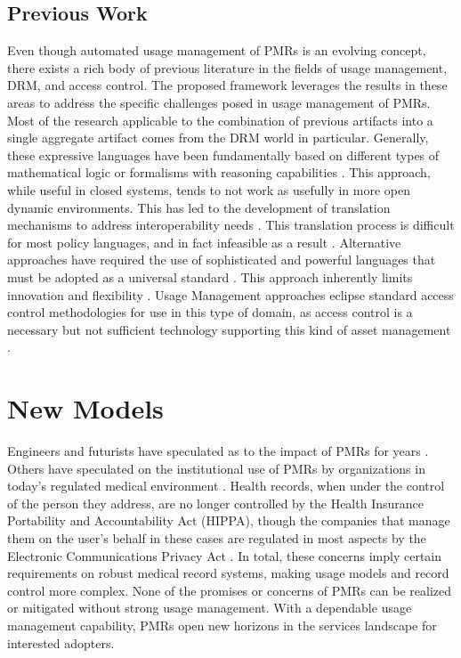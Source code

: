 \documentclass[10pt, conference, compsocconf]{IEEEtran}
\begin{document}
\subsection{Previous Work}
Even though automated usage management of PMRs is an evolving concept, there exists a rich body of previous literature in the fields of usage management, DRM, and access control. The proposed framework leverages the results in these areas to address the specific challenges posed in usage management of PMRs. Most of the research applicable to the combination of previous artifacts into a single aggregate artifact comes from the DRM world in particular.  Generally, these expressive languages have been fundamentally based on different types of mathematical logic or formalisms with reasoning capabilities \cite{ArHu:07,BaMi:06,ChCoEtHaJoLa:03,HaWe:04,XiBjFu:08}.  This approach, while useful in closed systems, tends to not work as usefully in more open dynamic environments.  This has led to the development of translation mechanisms to address interoperability needs \cite{HeJa:05,PoPrDe:04,ScTaWo:04}.  This translation process is difficult for most policy languages, and in fact infeasible as a result \cite{KoLaMaMi:04,SaShUe:04}.  Alternative approaches have required the use of sophisticated and powerful languages that must be adopted as a universal standard \cite{OMADRM,ODRL-req,Wa:04,XrML-spec}.  This approach inherently limits innovation and flexibility \cite{HeJa:05,JaHe:04,JaHe:08,JaHeMa:06}.  Usage Management approaches eclipse standard access control methodologies for use in this type of domain, as access control is a necessary but not sufficient technology supporting this kind of asset management \cite{PaSa:04,BL:73,BL:76}.

\section{New Models}
Engineers and futurists have speculated as to the impact of PMRs for years \cite{Emr:Web:BestCaseEMR,Emr:Web:WorstCaseEMR}.  Others have speculated on the institutional use of PMRs by organizations in today's regulated medical environment \cite{Emr:doi:10.1056/NEJMc081118}.  Health records, when under the control of the person they address, are no longer controlled by the Health Insurance Portability and Accountability Act (HIPPA), though the companies that manage them on the user's behalf in these cases are regulated in most aspects by the Electronic Communications Privacy Act \cite{Emr:doi:10.1056/NEJMsb0800220}.  In total, these concerns imply certain requirements on robust medical record systems, making usage models and record control more complex.  None of the promises or concerns of PMRs can be realized or mitigated without strong usage management.  With a dependable usage management capability, PMRs open new horizons in the services landscape for interested adopters.
\end{document}
